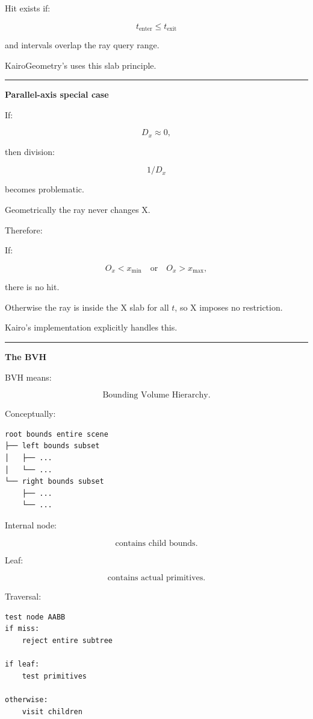 Hit exists if:

\[
\boxed{
t_{\text{enter}}
\le
t_{\text{exit}}
}
\]

and intervals overlap the ray query range.

KairoGeometry's  uses this slab principle.

\begin{center}\rule{0.5\linewidth}{0.5pt}\end{center}

\textbf{Parallel-axis special case}

If:

\[
D_x\approx0,
\]

then division:

\[
1/D_x
\]

becomes problematic.

Geometrically the ray never changes X.

Therefore:

If:

\[
O_x<x_{\min}
\quad\text{or}\quad
O_x>x_{\max},
\]

there is no hit.

Otherwise the ray is inside the X slab for all \(t\), so X imposes no restriction.

Kairo's implementation explicitly handles this.

\begin{center}\rule{0.5\linewidth}{0.5pt}\end{center}

\textbf{The BVH}

BVH means:

\[
\boxed{\text{Bounding Volume Hierarchy}.}
\]

Conceptually:

\begin{verbatim}
root bounds entire scene
├── left bounds subset
│   ├── ...
│   └── ...
└── right bounds subset
    ├── ...
    └── ...
\end{verbatim}

Internal node:

\[
\text{contains child bounds}.
\]

Leaf:

\[
\text{contains actual primitives}.
\]

Traversal:

\begin{verbatim}
test node AABB
if miss:
    reject entire subtree

if leaf:
    test primitives

otherwise:
    visit children
\end{verbatim}

